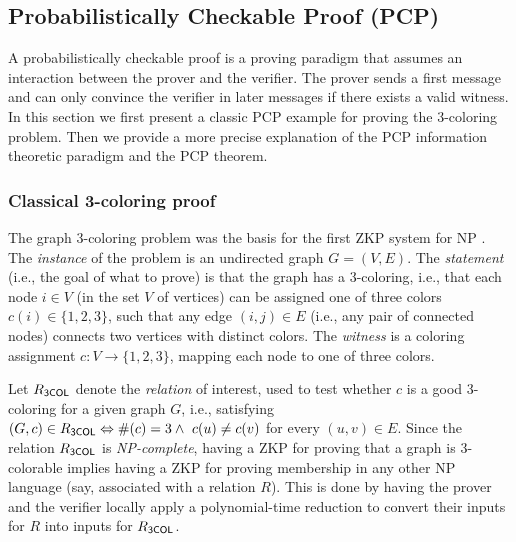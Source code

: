 

\subsection{Probabilistically Checkable Proof (PCP)}
\label{paradigms:IT:PCP}

A probabilistically checkable proof is a proving paradigm that assumes an interaction between the prover and the verifier.
The prover sends a first message and can only convince the verifier in later messages if there exists a valid witness.
In this section we first present a classic PCP example for proving the $3$-coloring problem.
Then we provide a more precise explanation of the PCP information theoretic paradigm and the PCP theorem.


\subsubsection{Classical 3-coloring proof}\label{sec:3coloring}
\label{paradigms:IT:PCP:3-col}


The graph 3-coloring problem was the basis for the first ZKP system for NP \cite{1991:GMW:JACM:proofs-that-yield-nothing-but-their-validity}.
The \emph{instance} of the problem is an undirected graph $G=(V,E)$.
The \emph{statement} (i.e., the goal of what to prove) is that the graph has a 3-coloring, i.e., that each node $i \in V$ (in the set $V$ of vertices) can be assigned one of three colors $c(i) \in \{1,2,3\}$, such that any edge $(i,j) \in E$ (i.e., any pair of connected nodes) connects two vertices with distinct colors.
The \emph{witness} is a coloring assignment $c:V\to\{1,2,3\}$, mapping each node to one of three colors.


Let $R_{\sf 3COL}$ denote the \emph{relation} of interest, used to test whether $c$ is a good 3-coloring for a given graph $G$, i.e., satisfying $(G,c)\in R_{\sf 3COL} \Leftrightarrow \#(c) = 3 \wedge ~c(u)\neq  c(v)$ for every $(u,v)\in E$.
Since the relation $R_{\sf 3COL}$ is {\em NP-complete}, having a ZKP for proving that a graph is 3-colorable implies having a ZKP for proving membership in any other NP language (say, associated with a relation $R$).
This is done by having the prover and the verifier locally apply a polynomial-time reduction to convert their inputs for $R$ into inputs for $R_{\sf 3COL}$. 


